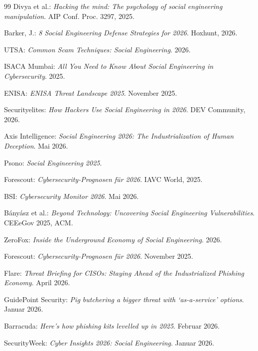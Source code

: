 \documentclass[10pt,a4paper]{article}
\begin{document}
\begin{thebibliography}{99}
		Divya et al.: \textit{Hacking the mind: The psychology of social engineering manipulation}. AIP Conf. Proc. 3297, 2025.
		
		Barker, J.: \textit{8 Social Engineering Defense Strategies for 2026}. Hoxhunt, 2026.
		
		UTSA: \textit{Common Scam Techniques: Social Engineering}. 2026.
		
		ISACA Mumbai: \textit{All You Need to Know About Social Engineering in Cybersecurity}. 2025.
		
		ENISA: \textit{ENISA Threat Landscape 2025}. November 2025.
		
		Securityelites: \textit{How Hackers Use Social Engineering in 2026}. DEV Community, 2026.
		
		Axis Intelligence: \textit{Social Engineering 2026: The Industrialization of Human Deception}. Mai 2026.
		
		Psono: \textit{Social Engineering 2025}.
		
		Forescout: \textit{Cybersecurity-Prognosen für 2026}. IAVC World, 2025.
		
		BSI: \textit{Cybersecurity Monitor 2026}. Mai 2026.
		
		Bányász et al.: \textit{Beyond Technology: Uncovering Social Engineering Vulnerabilities}. CEEeGov 2025, ACM.
		
		ZeroFox: \textit{Inside the Underground Economy of Social Engineering}. 2026.
		
		Forescout: \textit{Cybersecurity-Prognosen für 2026}. November 2025.
		
		Flare: \textit{Threat Briefing for CISOs: Staying Ahead of the Industrialized Phishing Economy}. April 2026.
		
		GuidePoint Security: \textit{Pig butchering a bigger threat with ‘as-a-service’ options}. Januar 2026.
		
		Barracuda: \textit{Here’s how phishing kits levelled up in 2025}. Februar 2026.
		
		SecurityWeek: \textit{Cyber Insights 2026: Social Engineering}. Januar 2026.
		

\end{thebibliography}
\end{document}
